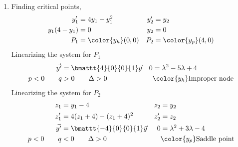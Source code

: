 \begin{enumerate}
    \item Finding critical points,
          \begin{align}
              y_1'         & = 4y_1 - y_1^{2}     & y_2' & = y_2 \\
              y_1(4 - y_1) & = 0                  & y_2  & = 0   \\
              P_1          & = \color{y_h}(0, 0)  &
              P_2          & = \color{y_p} (4, 0)
          \end{align}
          Linearizing the system for $ P_1 $
          \begin{align}
              \vec{y'}       & = \bmattt{4}{0}{0}{1} \vec{y}    &
              0              & = \lambda^{2} - 5\lambda + 4       \\
              p < 0 \qquad q & > 0 \qquad \Delta >0             &
                             & \color{y_h} \text{Improper node}
          \end{align}
          Linearizing the system for $ P_2 $
          \begin{align}
              z_1            & = y_1 - 4                       &
              z_2            & = y_2                             \\
              z_1'           & = 4(z_1 + 4) - (z_1 + 4)^{2}    &
              z_2'           & = z_2                             \\
              \vec{y'}       & = \bmattt{-4}{0}{0}{1} \vec{y}  &
              0              & = \lambda^{2} + 3\lambda - 4      \\
              p < 0 \qquad q & < 0 \qquad \Delta >0            &
                             & \color{y_p} \text{Saddle point}
          \end{align}


\end{enumerate}
